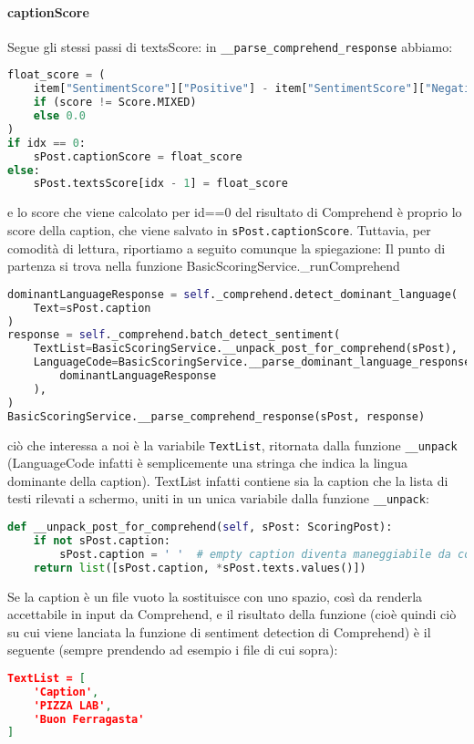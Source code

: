 \paragraph{captionScore}
Segue gli stessi passi di textsScore: in \verb+__parse_comprehend_response+ abbiamo:
\begin{lstlisting}[language=Python]
float_score = (
    item["SentimentScore"]["Positive"] - item["SentimentScore"]["Negative"]
    if (score != Score.MIXED)
    else 0.0
)
if idx == 0:
    sPost.captionScore = float_score
else:
    sPost.textsScore[idx - 1] = float_score
\end{lstlisting}
e lo score che viene calcolato per id==0 del risultato di Comprehend è proprio lo score della
caption, che viene salvato in \verb+sPost.captionScore+.
Tuttavia, per comodità di lettura, riportiamo a seguito comunque la spiegazione:
Il punto di partenza si trova nella funzione BasicScoringService.\_runComprehend
\begin{lstlisting}[language=Python]
dominantLanguageResponse = self._comprehend.detect_dominant_language(
    Text=sPost.caption
)
response = self._comprehend.batch_detect_sentiment(
    TextList=BasicScoringService.__unpack_post_for_comprehend(sPost),
    LanguageCode=BasicScoringService.__parse_dominant_language_response(
        dominantLanguageResponse
    ),
)
BasicScoringService.__parse_comprehend_response(sPost, response)
\end{lstlisting}
ciò che interessa a noi è la variabile \verb+TextList+, ritornata dalla funzione \verb+__unpack+ 
(LanguageCode infatti è semplicemente una stringa che indica la lingua dominante della caption).
TextList infatti contiene sia la caption che la lista di testi rilevati a schermo, uniti in un
unica variabile dalla funzione \verb+__unpack+:
\begin{lstlisting}[language=Python]
def __unpack_post_for_comprehend(self, sPost: ScoringPost):
    if not sPost.caption:
        sPost.caption = ' '  # empty caption diventa maneggiabile da comprehend
    return list([sPost.caption, *sPost.texts.values()])
\end{lstlisting}
Se la caption è un file vuoto la sostituisce con uno spazio, così da renderla accettabile in input
da Comprehend, e il risultato della funzione (cioè quindi ciò su cui viene lanciata la funzione di
sentiment detection di Comprehend) è il seguente (sempre prendendo ad esempio i file di cui sopra):
\begin{lstlisting}[language=JSON]
TextList = [
    'Caption',
    'PIZZA LAB',
    'Buon Ferragasta'
]
\end{lstlisting}
